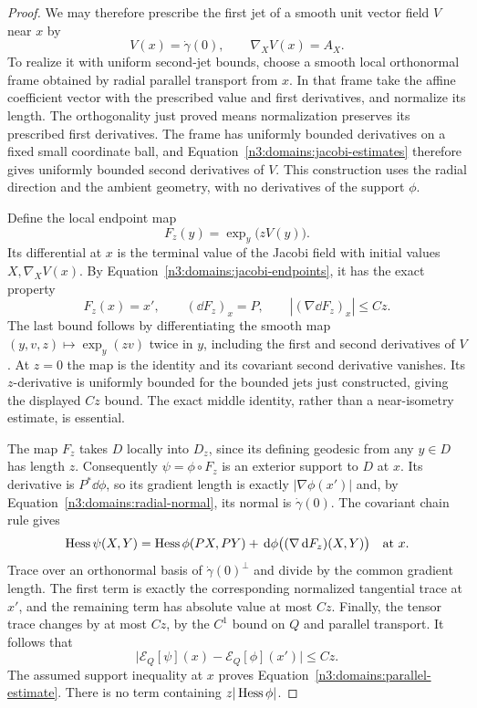 \begin{proof}
We may therefore prescribe the first jet of a smooth unit vector
field $V$ near $x$ by
\[
 V(x)=\dot\gamma(0),\qquad \nabla_XV(x)=A_X.
\]
To realize it with uniform second-jet bounds, choose a smooth local
orthonormal frame obtained by radial parallel transport from $x$.
In that frame take the affine coefficient vector with the prescribed
value and first derivatives, and normalize its length.  The
orthogonality just proved means normalization preserves its prescribed
first derivatives.  The frame has uniformly bounded derivatives on
a fixed small coordinate ball, and Equation~\eqref{n3:domains:jacobi-estimates}
therefore gives uniformly bounded second derivatives of $V$.
This construction uses the radial direction and the ambient
geometry, with no derivatives of the support $\phi$.

Define the local endpoint map
\[
 F_z(y)=\exp_y\bigl(zV(y)\bigr).
\]
Its differential at $x$ is the terminal value of the Jacobi field
with initial values $X,\nabla_XV(x)$.  By
Equation~\eqref{n3:domains:jacobi-endpoints}, it has the exact property
\begin{equation}\label{n3:domains:exact-endpoint-isometry}
 F_z(x)=x',\qquad (\dd F_z)_x=P,
 \qquad |(\nabla\dd F_z)_x|\leq Cz.
\end{equation}
The last bound follows by differentiating the
smooth map $(y,v,z)\mapsto\exp_y(zv)$ twice in $y$, including the
first and second derivatives of $V$.  At $z=0$ the map is the
identity and its covariant second derivative vanishes.  Its
$z$-derivative is uniformly bounded for the bounded jets just
constructed, giving the displayed $Cz$ bound.  The exact middle
identity, rather than a near-isometry estimate, is essential.

The map $F_z$ takes $D$ locally into $D_z$, since its defining
geodesic from any $y\in D$ has length $z$.  Consequently
$\psi=\phi\circ F_z$ is an exterior support to $D$ at $x$.
Its derivative is $P^*\dd\phi$, so its gradient length is exactly
$|\nabla\phi(x')|$ and, by
Equation~\eqref{n3:domains:radial-normal}, its normal is
$\dot\gamma(0)$.  The covariant chain rule gives
\[
 \operatorname{Hess}\psi(X,Y)
   =\operatorname{Hess}\phi(PX,PY)
        +\,\mathrm d\phi\bigl((\nabla\,\mathrm d F_z)(X,Y)\bigr)
 \quad\hbox{at }x.
\]
Trace over an orthonormal basis of $\dot\gamma(0)^\perp$ and divide
by the common gradient length.  The first term is exactly the
corresponding normalized tangential trace at $x'$, and the remaining
term has absolute value at most $Cz$.  Finally, the tensor trace
changes by at most $Cz$, by the $C^1$ bound on $Q$ and parallel
transport.  It follows that
\[
 \bigl|\mathcal E_Q[\psi](x)
             -\mathcal E_Q[\phi](x')\bigr|\leq Cz.
\]
The assumed support inequality at $x$ proves
Equation~\eqref{n3:domains:parallel-estimate}.  There is no term
containing $z|\operatorname{Hess}\phi|$.
\end{proof}

